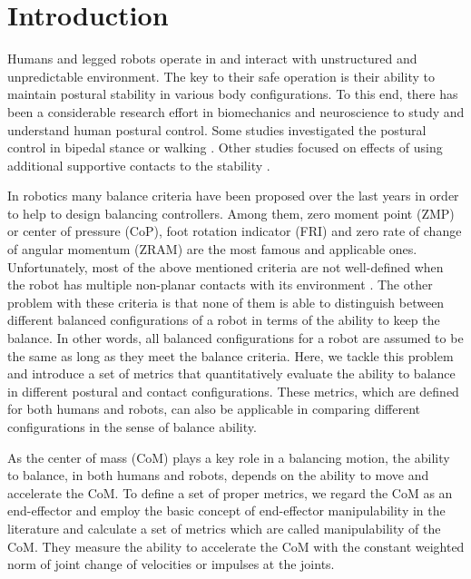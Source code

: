 \section{Introduction}

Humans and legged robots operate in and interact with unstructured and
unpredictable environment.  The key to their safe operation is their ability
to maintain postural stability in various body configurations.  To this end,
there has been a considerable research effort in biomechanics and neuroscience
to study and understand human postural control.  Some studies investigated the
postural control in bipedal stance or walking \cite{Horak&Nashner86,
  Mergner10, Winter95}.  Other studies focused on effects of using additional
supportive contacts to the stability \cite{Babicetal14, Maki&Mcllroy97}.

In robotics many balance criteria have been proposed over the last years in
order to help to design balancing controllers.  Among them, zero moment point
(ZMP) \cite{Vukobratovic&Borovac04, Vukobratovicetal70} or center of pressure
(CoP), foot rotation indicator (FRI) \cite{Goswami99} and zero rate of change
of angular momentum (ZRAM) \cite{Goswami&Kallem04} are the most famous and
applicable ones.  Unfortunately, most of the above mentioned criteria are not
well-defined when the robot has multiple non-planar contacts with its
environment \cite{Goswami&Kallem04}.  The other problem with these criteria is
that none of them is able to distinguish between different balanced
configurations of a robot in terms of the ability to keep the balance.  In
other words, all balanced configurations for a robot are assumed to be the
same as long as they meet the balance criteria.  Here, we tackle this problem
and introduce a set of metrics that quantitatively evaluate the ability to
balance in different postural and contact configurations.  These metrics,
which are defined for both humans and robots, can also be applicable in
comparing different configurations in the sense of balance ability.

As the center of mass (CoM) plays a key role in a balancing motion, the
ability to balance, in both humans and robots, depends on the ability to move
and accelerate the CoM.  To define a set of proper metrics, we regard the CoM
as an end-effector and employ the basic concept of end-effector manipulability
in the literature \cite{Dotyetal95} and calculate a set of metrics which are
called manipulability of the CoM.  They measure the ability to accelerate the
CoM with the constant weighted norm of joint change of velocities or impulses
at the joints.

